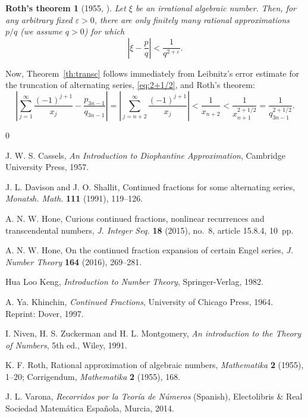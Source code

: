 \documentclass[11pt, a4paper]{amsart}
\theoremstyle{plain}
\newtheorem*{roth}{Roth's theorem}
\theoremstyle{remark}
\begin{document}
\begin{roth}[1955, \cite{Roth, Cas}]
Let $\xi$ be an irrational algebraic number. Then, for any arbitrary fixed $\varepsilon > 0$, there are only finitely many rational approximations~$p/q$ (we assume $q>0$) for which
\[
  \left| \xi - \frac{p}{q} \right| < \frac{1}{q^{2+\varepsilon}}.
\]
\end{roth}

Now, Theorem~\ref{th:transc} follows immediately from Leibnitz's error estimate for the truncation of alternating series, \eqref{eq:2+1/2}, and Roth's theorem:
\[
  \left| \sum_{j=1}^\infty \frac{(-1)^{j+1}}{x_j} - \frac{p_{3n-1}}{q_{3n-1}} \right| 
  = \left| \sum_{j=n+2}^{\infty} \frac{(-1)^{j+1}}{x_j} \right|
  < \frac{1}{x_{n+2}} < \frac{1}{x_{n+1}^{2+1/2}} = \frac{1}{q_{3n-1}^{2+1/2}}.
\]

\begin{thebibliography}{0}

J. W. S. Cassels, 
\textit{An Introduction to Diophantine Approximation}, 
Cambridge University Press, 1957.

J. L. Davison and J. O. Shallit, 
Continued fractions for some alternating series, 
\textit{Monatsh. Math.} \textbf{111} (1991), 119--126.

A. N. W. Hone, 
Curious continued fractions, nonlinear recurrences and transcendental numbers, 
\textit{J. Integer Seq.} \textbf{18} (2015), no.~8, article 15.8.4, 10~pp.

A. N. W. Hone, 
On the continued fraction expansion of certain Engel series, 
\textit{J. Number Theory} \textbf{164} (2016), 269--281.

Hua Loo Keng, 
\textit{Introduction to Number Theory}, 
Springer-Verlag, 1982.

A. Ya. Khinchin, 
\textit{Continued Fractions}, 
University of Chicago Press, 1964.
Reprint: Dover, 1997.

I. Niven, H. S. Zuckerman and H. L. Montgomery, 
\textit{An introduction to the Theory of Numbers}, 5th ed., 
Wiley, 1991.

K. F. Roth, 
Rational approximation of algebraic numbers, 
\textit{Mathematika} \textbf{2} (1955), 1--20; 
Corrigendum, \textit{Mathematika} \textbf{2} (1955), 168.

J. L. Varona, 
\textit{Recorridos por la Teor\'ia de N\'umeros} (Spanish),
Electolibris \& Real Sociedad Matem\'atica Espa\~nola, Murcia, 2014.

\end{thebibliography}

\end{document}
